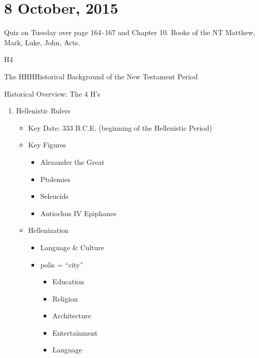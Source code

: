 \documentclass{article}
\begin{document}
    \section{8 October, 2015}

    Quiz on Tuesday over page 164\texttt{-}167 and Chapter 10. Books of the NT Matthew, Mark, Luke, John, Acts.

    H4

    The HHHHistorical Background of the New Testament Period

    \centerline{Historical Overview: The 4 H's}

    \begin{enumerate}
        \item Hellenistic Rulers \\
            \begin{itemize}
                \item Key Date: 333 B.C.E. (beginning of the Hellenistic Period)
                \item Key Figures \\
                    \begin{itemize}
                        \item Alexander the Great
                        \item Ptolemies
                        \item Seleucids
                        \item Antiochus IV Epiphanes
                    \end{itemize}
                \item Hellenization \\
                    \begin{itemize}
                        \item Language \& Culture
                        \item polis = ``city''
                            \begin{itemize}
                                \item Education
                                \item Religion
                                \item Architecture
                                \item Entertainment
                                \item Language
                            \end{itemize}
                    \end{itemize}
            \end{itemize}
    \end{enumerate}
\end{document}
